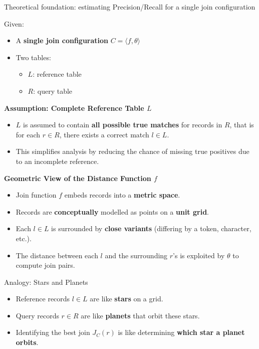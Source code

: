 \documentclass[8pt]{beamer} %
\begin{document}
\begin{frame}{Theoretical foundation: estimating Precision/Recall for a single join configuration}
	
	Given:
	\begin{itemize}
		\item A \textbf{single join configuration} $C = \langle f, \theta \rangle$
		\item Two tables:
		\begin{itemize}
			\item $L$: reference table
			\item $R$: query table
		\end{itemize}
	\end{itemize}
	
	\vspace{0.5em}
	\textbf{Assumption: Complete Reference Table $L$}
	\begin{itemize}
		\item $L$ is assumed to contain \textbf{all possible true matches} for records in $R$, that is for each $r \in R$, there exists a correct match $l \in L$.
		\item This simplifies analysis by reducing the chance of missing true positives due to an incomplete reference.
	\end{itemize}
	
	\vspace{0.5em}
	\textbf{Geometric View of the Distance Function $f$}
	\begin{itemize}
		\item Join function $f$ embeds records into a \textbf{metric space}.
		\item Records are \textbf{conceptually} modelled as points on a \textbf{unit grid}.
		\item Each $l \in L$ is surrounded by \textbf{close variants} (differing by a token, character, etc.).
		\item The distance between each $l$ and the surrounding $r$'s is exploited by $\theta$ to compute join pairs.
	\end{itemize}
	
	\vspace{0.5em}
	\begin{block}{Analogy: Stars and Planets}
		\begin{itemize}
			\item Reference records $l \in L$ are like \textbf{stars} on a grid.
			\item Query records $r \in R$ are like \textbf{planets} that orbit these stars.
			\item Identifying the best join $J_C(r)$ is like determining \textbf{which star a planet orbits}.
		\end{itemize}
	\end{block}
	
\end{frame}
\end{document}
